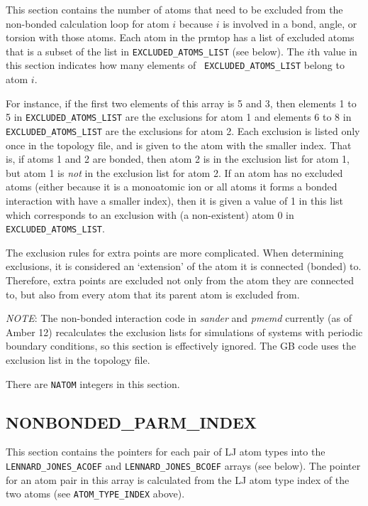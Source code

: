 This section contains the number of atoms that need to be excluded from the
non-bonded calculation loop for atom $i$ because $i$ is involved in a bond,
angle, or torsion with those atoms. Each atom in the prmtop has a list of
excluded atoms that is a subset of the list in {\tt EXCLUDED\_ATOMS\_LIST} (see
below). The $i$th value in this section indicates how many elements of {\tt
EXCLUDED\_ATOMS\_LIST} belong to atom $i$.

For instance, if the first two elements of this array is 5 and 3, then elements
1 to 5 in {\tt EXCLUDED\_ATOMS\_LIST} are the exclusions for atom 1 and elements
6 to 8 in {\tt EXCLUDED\_ATOMS\_LIST} are the exclusions for atom 2. Each
exclusion is listed only once in the topology file, and is given to the atom
with the smaller index. That is, if atoms 1 and 2 are bonded, then atom 2 is in
the exclusion list for atom 1, but atom 1 is \emph{not} in the exclusion list
for atom 2. If an atom has no excluded atoms (either because it is a monoatomic
ion or all atoms it forms a bonded interaction with have a smaller index), then
it is given a value of 1 in this list which corresponds to an exclusion with (a
non-existent) atom 0 in {\tt EXCLUDED\_ATOMS\_LIST}.

The exclusion rules for extra points are more complicated. When determining
exclusions, it is considered an `extension' of the atom it is connected (bonded)
to. Therefore, extra points are excluded not only from the atom they are
connected to, but also from every atom that its parent atom is excluded from.

\emph{NOTE}: The non-bonded interaction code in \emph{sander} and \emph{pmemd}
currently (as of Amber 12) recalculates the exclusion lists for simulations of
systems with periodic boundary conditions, so this section is effectively
ignored. The GB code uses the exclusion list in the topology file.


\noindent There are {\tt NATOM} integers in this section.

\subsection*{NONBONDED\_PARM\_INDEX}

This section contains the pointers for each pair of LJ atom types into the {\tt
LENNARD\_JONES\_ACOEF} and {\tt LENNARD\_JONES\_BCOEF} arrays (see below). The
pointer for an atom pair in this array is calculated from the LJ atom type index
of the two atoms (see {\tt ATOM\_TYPE\_INDEX} above).

